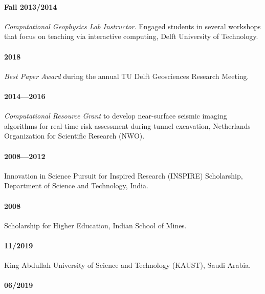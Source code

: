 \documentclass[9pt]{developercv} %
\begin{document}
\paragraph{Fall
2013/2014}\label{fall-20132014}

\emph{Computational
Geophysics
Lab
Instructor}.
Engaged
students
in several
workshops
that focus
on
teaching
via
interactive
computing,
Delft
University
of
Technology.

\label{awards-and-grants}

\paragraph{2018}\label{section-5}

\emph{Best
Paper
Award}
during the
annual TU
Delft
Geosciences
Research
Meeting.

\paragraph{2014---2016}\label{section-6}

\emph{Computational
Resource
Grant} to
develop
near-surface
seismic
imaging
algorithms
for
real-time
risk
assessment
during
tunnel
excavation,
Netherlands
Organization
for
Scientific
Research
(NWO).

\paragraph{2008---2012}\label{section-7}

Innovation
in Science
Pursuit
for
Inspired
Research
(INSPIRE)
Scholarship,
Department
of Science
and
Technology,
India.

\paragraph{2008}\label{section-8}

Scholarship
for Higher
Education,
Indian
School of
Mines.

\label{invited-talks}

\paragraph{11/2019}\label{section-9}

King
Abdullah
University
of Science
and
Technology
(KAUST),
Saudi
Arabia.

\paragraph{06/2019}\label{section-10}
\end{document}

